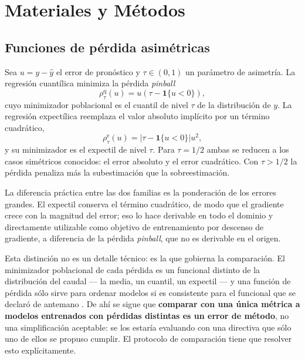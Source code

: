 %
\chapter{Materiales y Métodos}

\section{Funciones de pérdida asimétricas}

Sea $u = y - \hat{y}$ el error de pronóstico y $\tau \in (0,1)$ un parámetro de asimetría.
La regresión cuantílica \cite{koenker-bassett-1978} minimiza la pérdida \textit{pinball}
\begin{equation}
  \rho^{\mathrm{q}}_{\tau}(u) = u \left( \tau - \mathbf{1}\{u < 0\} \right),
\end{equation}
cuyo minimizador poblacional es el cuantil de nivel $\tau$ de la distribución de $y$.
La regresión expectílica \cite{newey-powell-1987} reemplaza el valor absoluto implícito por un
término cuadrático,
\begin{equation}
  \rho^{\mathrm{e}}_{\tau}(u) = \left| \tau - \mathbf{1}\{u < 0\} \right| u^{2},
\end{equation}
y su minimizador es el expectil de nivel $\tau$.
Para $\tau = 1/2$ ambas se reducen a los casos simétricos conocidos: el error absoluto y el error
cuadrático.
Con $\tau > 1/2$ la pérdida penaliza más la subestimación que la sobreestimación.

La diferencia práctica entre las dos familias es la ponderación de los errores grandes.
El expectil conserva el término cuadrático, de modo que el gradiente crece con la magnitud del
error; eso lo hace derivable en todo el dominio y directamente utilizable como objetivo de
entrenamiento por descenso de gradiente, a diferencia de la pérdida \textit{pinball}, que no es
derivable en el origen.

Esta distinción no es un detalle técnico: es la que gobierna la comparación.
El minimizador poblacional de cada pérdida es un funcional distinto de la distribución del caudal
--- la media, un cuantil, un expectil --- y una función de pérdida sólo sirve para ordenar modelos
si es consistente para el funcional que se declaró de antemano
\cite{gneiting-2011-making-evaluating-point-forecasts}.
De ahí se sigue que \textbf{comparar con una única métrica a modelos entrenados con pérdidas distintas
es un error de método}, no una simplificación aceptable: se los estaría evaluando con una
directiva que sólo uno de ellos se propuso cumplir.
El protocolo de comparación tiene que resolver esto explícitamente.

